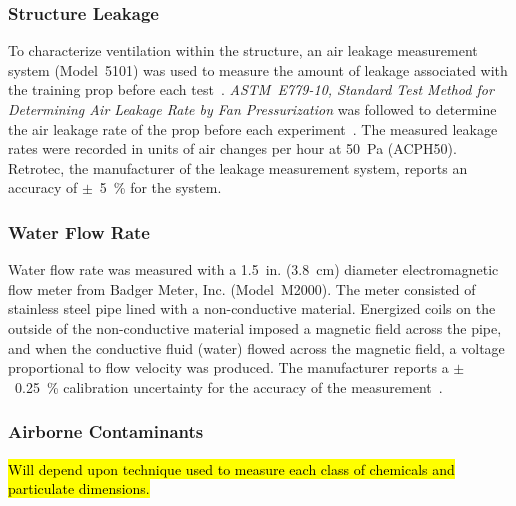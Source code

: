 \documentclass[12pt,oneside]{book}
\begin{document}
\subsubsection*{Structure Leakage} 
To characterize ventilation within the structure, an air leakage measurement system (Model~5101) was used to measure the amount of leakage associated with the training prop before each test~\cite{retrotec:leakage}. \textit{ASTM~E779-10, Standard Test Method for Determining Air Leakage Rate by Fan Pressurization} was followed to determine the air leakage rate of the prop before each experiment~\cite{astm_e779}. The measured leakage rates were recorded in units of air changes per hour at 50~Pa (ACPH50). Retrotec, the manufacturer of the leakage measurement system, reports an accuracy of $\pm$~5~\% for the system.

\subsubsection*{Water Flow Rate}
Water flow rate was measured with a 1.5~in. (3.8~cm) diameter electromagnetic flow meter from Badger Meter, Inc. (Model~M2000). The meter consisted of stainless steel pipe lined with a non-conductive material. Energized coils on the outside of the non-conductive material imposed a magnetic field across the pipe, and when the conductive fluid (water) flowed across the magnetic field, a voltage proportional to flow velocity was produced. The manufacturer reports a $\pm$~0.25~\% calibration uncertainty for the accuracy of the measurement~\cite{Badger:2015}.

\subsubsection*{Airborne Contaminants}
\hl{Will depend upon technique used to measure each class of chemicals and particulate dimensions.} 
\end{document}
